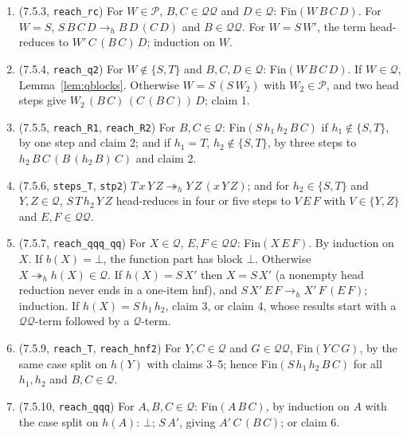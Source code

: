 \documentclass[11pt]{amsart}
\theoremstyle{definition}
\theoremstyle{remark}
\newcommand{\lean}[1]{\texttt{#1}}
\newcommand{\hred}{\to_{h}}
\newcommand{\Q}{\mathcal Q}
\newcommand{\Pc}{\mathcal P}
\begin{document}
\begin{enumerate}
\item (7.5.3, \lean{reach\_rc}) For $W\in\Pc$, $B,C\in\Q\Q$ and $D\in\Q$: Fin$(W\,B\,C\,D)$.
  For $W=S$, $S\,B\,C\,D\hred B\,D\,(C\,D)$ and $B\in\Q\Q$. For $W=S\,W'$, the term
  head-reduces to $W'\,C\,(B\,C)\,D$; induction on $W$.
\item (7.5.4, \lean{reach\_q2}) For $W\notin\{S,T\}$ and $B,C,D\in\Q$: Fin$(W\,B\,C\,D)$. If
  $W\in\Q$, Lemma~\ref{lem:qblocks}. Otherwise $W=S\,(S\,W_2)$ with $W_2\in\Pc$, and two head
  steps give $W_2\,(B\,C)\,(C\,(B\,C))\,D$; claim 1.
\item (7.5.5, \lean{reach\_R1}, \lean{reach\_R2}) For $B,C\in\Q$: Fin$(S\,h_1\,h_2\,B\,C)$ if
  $h_1\notin\{S,T\}$, by one step and claim 2; and if $h_1=T$, $h_2\notin\{S,T\}$, by three
  steps to $h_2\,B\,C\,(B\,(h_2\,B)\,C)$ and claim 2.
\item (7.5.6, \lean{steps\_T}, \lean{stp2}) $T\,x\,Y\,Z\twoheadrightarrow_h Y\,Z\,(x\,Y\,Z)$;
  and for $h_2\in\{S,T\}$ and $Y,Z\in\Q$, $S\,T\,h_2\,Y\,Z$ head-reduces in four or five steps
  to $V\,E\,F$ with $V\in\{Y,Z\}$ and $E,F\in\Q\Q$.
\item (7.5.7, \lean{reach\_qqq\_qq}) For $X\in\Q$, $E,F\in\Q\Q$: Fin$(X\,E\,F)$. By induction on
  $X$. If $b(X)=\bot$, the function part has block $\bot$. Otherwise $X\twoheadrightarrow_h
  h(X)\in\Q$. If $h(X)=S\,X'$ then $X=S\,X'$ (a nonempty head reduction never ends in a
  one-item hnf), and $S\,X'\,E\,F\hred X'\,F\,(E\,F)$; induction. If $h(X)=S\,h_1\,h_2$, claim 3,
  or claim 4, whose results start with a $\Q\Q$-term followed by a $\Q$-term.
\item (7.5.9, \lean{reach\_T}, \lean{reach\_hnf2}) For $Y,C\in\Q$ and $G\in\Q\Q$, Fin$(Y\,C\,G)$, by
  the same case split on $h(Y)$ with claims 3--5; hence Fin$(S\,h_1\,h_2\,B\,C)$ for all
  $h_1,h_2$ and $B,C\in\Q$.
\item (7.5.10, \lean{reach\_qqq}) For $A,B,C\in\Q$: Fin$(A\,B\,C)$, by induction on $A$ with the
  case split on $h(A)$: $\bot$; $S\,A'$, giving $A'\,C\,(B\,C)$; or claim 6.
\end{enumerate}
\end{document}
